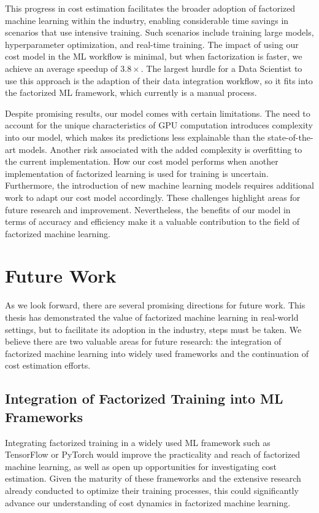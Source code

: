 This progress in cost estimation facilitates the broader adoption of factorized machine learning within the industry, enabling considerable time savings in scenarios that use intensive training. Such scenarios include training large models, hyperparameter optimization, and real-time training. The impact of using our cost model in the ML workflow is minimal, but when factorization is faster, we achieve an average speedup of $3.8\times$. The largest hurdle for a Data Scientist to use this approach is the adaption of their data integration workflow, so it fits into the factorized ML framework, which currently is a manual process.

Despite promising results, our model comes with certain limitations. The need to account for the unique characteristics of GPU computation introduces complexity into our model, which makes its predictions less explainable than the state-of-the-art models. Another risk associated with the added complexity is overfitting to the current implementation. How our cost model performs when another implementation of factorized learning is used for training is uncertain. Furthermore, the introduction of new machine learning models requires additional work to adapt our cost model accordingly. These challenges highlight areas for future research and improvement. Nevertheless, the benefits of our model in terms of accuracy and efficiency make it a valuable contribution to the field of factorized machine learning.

\section{Future Work}
\label{sec:7-future-work}
As we look forward, there are several promising directions for future work. This thesis has demonstrated the value of factorized machine learning in real-world settings, but to facilitate its adoption in the industry, steps must be taken. We believe there are two valuable areas for future research: the integration of factorized machine learning into widely used frameworks and the continuation of cost estimation efforts.

\subsection{Integration of Factorized Training into ML Frameworks}
Integrating factorized training in a widely used ML framework such as TensorFlow or PyTorch would improve the practicality and reach of factorized machine learning, as well as open up opportunities for investigating cost estimation. Given the maturity of these frameworks and the extensive research already conducted to optimize their training processes, this could significantly advance our understanding of cost dynamics in factorized machine learning.

